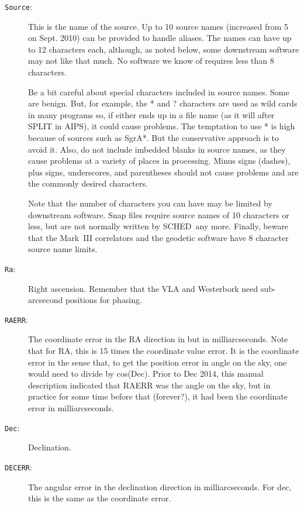 \documentclass{report}
\newcommand{\schedb}{{\sc SCHED~}}
\begin{document}
\begin{description}

\item [{\tt Source}:] This is the name of the source.  Up to 10 source
names (increased from 5 on Sept. 2010) can be provided to handle
aliases.  The names can have up to 12 characters each, although, as
noted below, some downstream software may not like that much.  No
software we know of requires less than 8 characters.

Be a bit careful about special characters included in source names.
Some are benign.  But, for example, the * and ? characters are used as
wild cards in many programs so, if either ends up in a file name (as
it will after SPLIT in AIPS), it could cause problems.  The temptation
to use * is high because of sources such as SgrA*.  But the
conservative approach is to avoid it.  Also, do not include imbedded
blanks in source names, as they cause problems at a variety of places
in processing.  Minus signs (dashes), plus signs, underscores, and
parentheses should not cause problems and are the commonly desired
characters.

Note that the number of characters you can have may be limited by
downstream software.  Snap files require source names of 10 characters
or less, but are not normally written by \schedb any more.
Finally, beware that the Mark~III correlators and the geodetic
software have 8 character source name limits.

\item [{\tt Ra}:] Right ascension. Remember that the VLA and
Westerbork need sub-arcsecond positions for phasing.

\item [{\tt RAERR}:] The coordinate error in the RA direction in but
in milliarcseconds.  Note that for RA, this is 15 times the coordinate
value error.  It is the coordinate error in the sense that, to get
the position error in angle on the sky, one would need to divide by
cos(Dec).  Prior to Dec 2014, this manual description indicated that
RAERR was the angle on the sky, but in practice for some time before
that (forever?), it had been the coordinate error in milliarcseconds.

\item [{\tt Dec}:] Declination.

\item [{\tt DECERR}:] The angular error in the declination direction in
milliarcseconds.  For dec, this is the same as the coordinate error.


\end{description}
\end{document}
